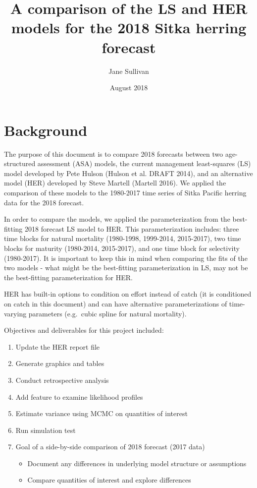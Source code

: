 \documentclass[]{article}
\title{A comparison of the LS and HER models for the 2018 Sitka herring
forecast}
\author{Jane Sullivan}
\date{August 2018}
\providecommand{\tightlist}{%
  \setlength{\itemsep}{0pt}\setlength{\parskip}{0pt}}
\begin{document}
\maketitle

\section{Background}\label{background}

The purpose of this document is to compare 2018 forecasts between two
age-structured assessment (ASA) models, the current management
least-squares (LS) model developed by Pete Hulson (Hulson et al. DRAFT
2014), and an alternative model (HER) developed by Steve Martell
(Martell 2016). We applied the comparison of these models to the
1980-2017 time series of Sitka Pacific herring data for the 2018
forecast.

In order to compare the models, we applied the parameterization from the
best-fitting 2018 forecast LS model to HER. This parameterization
includes: three time blocks for natural mortality (1980-1998, 1999-2014,
2015-2017), two time blocks for maturity (1980-2014, 2015-2017), and one
time block for selectivity (1980-2017). It is important to keep this in
mind when comparing the fits of the two models - what might be the
best-fitting parameterization in LS, may not be the best-fitting
parameterization for HER.

HER has built-in options to condition on effort instead of catch (it is
conditioned on catch in this document) and can have alternative
parameterizations of time-varying parameters (e.g.~cubic spline for
natural mortality).

Objectives and deliverables for this project included:

\begin{enumerate}
\def\labelenumi{\arabic{enumi}.}
\tightlist
\item
  Update the HER report file
\item
  Generate graphics and tables
\item
  Conduct retrospective analysis
\item
  Add feature to examine likelihood profiles
\item
  Estimate variance using MCMC on quantities of interest
\item
  Run simulation test
\item
  Goal of a side-by-side comparison of 2018 forecast (2017 data)

  \begin{itemize}
  \tightlist
  \item
    Document any differences in underlying model structure or
    assumptions
  \item
    Compare quantities of interest and explore differences
  \end{itemize}
\end{enumerate}
\end{document}
